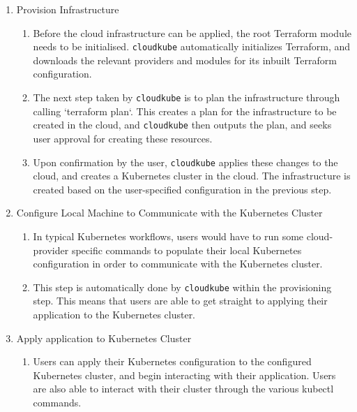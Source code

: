 \begin{enumerate}
\begin{enumerate}
        \end{enumerate}
    \item Provision Infrastructure 
        \begin{enumerate}
            \item Before the cloud infrastructure can be applied, the root Terraform module needs to be initialised. \texttt{cloudkube} automatically initializes Terraform, and downloads the relevant providers and modules for its inbuilt Terraform configuration.
            \item The next step taken by \texttt{cloudkube} is to plan the infrastructure through calling `terraform plan`. This creates a plan for the infrastructure to be created in the cloud, and \texttt{cloudkube} then outputs the plan, and seeks user approval for creating these resources.
            \item Upon confirmation by the user, \texttt{cloudkube} applies these changes to the cloud, and creates a Kubernetes cluster in the cloud. The infrastructure is created based on the user-specified configuration in the previous step. 
            
        \end{enumerate}
    \item Configure Local Machine to Communicate with the Kubernetes Cluster 
        \begin{enumerate}
            \item In typical Kubernetes workflows, users would have to run some cloud-provider specific commands to populate their local Kubernetes configuration in order to communicate with the Kubernetes cluster.
            \item This step is automatically done by \texttt{cloudkube} within the provisioning step. This means that users are able to get straight to applying their application to the Kubernetes cluster.
            
        \end{enumerate}
    \item Apply application to Kubernetes Cluster   
        \begin{enumerate}
            \item Users can apply their Kubernetes configuration to the configured Kubernetes cluster, and begin interacting with their application. Users are also able to interact with their cluster through the various kubectl commands.  
        \end{enumerate}
\end{enumerate}


